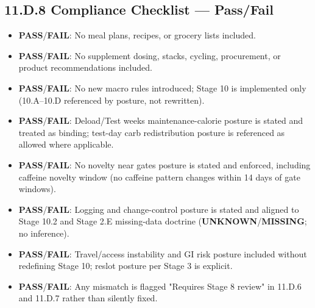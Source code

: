 \documentclass[10pt]{article}
\begin{document}
\newpage

\subsection*{11.D.8 Compliance Checklist — Pass/Fail}
{}

\begin{itemize}
\item \textbf{PASS}/\textbf{FAIL}: No meal plans, recipes, or grocery lists included.
\item \textbf{PASS}/\textbf{FAIL}: No supplement dosing, stacks, cycling, procurement, or product recommendations included.
\item \textbf{PASS}/\textbf{FAIL}: No new macro rules introduced; Stage 10 is implemented only (10.A–10.D referenced by posture, not rewritten).
\item \textbf{PASS}/\textbf{FAIL}: Deload/Test weeks maintenance-calorie posture is stated and treated as binding; test-day carb redistribution posture is referenced as allowed where applicable.
\item \textbf{PASS}/\textbf{FAIL}: No novelty near gates posture is stated and enforced, including caffeine novelty window (no caffeine pattern changes within 14 days of gate windows).
\item \textbf{PASS}/\textbf{FAIL}: Logging and change-control posture is stated and aligned to Stage 10.2 and Stage 2.E missing-data doctrine (\textbf{UNKNOWN}/\textbf{MISSING}; no inference).
\item \textbf{PASS}/\textbf{FAIL}: Travel/access instability and GI risk posture included without redefining Stage 10; reslot posture per Stage 3 is explicit.
\item \textbf{PASS}/\textbf{FAIL}: Any mismatch is flagged "Requires Stage 8 review" in 11.D.6 and 11.D.7 rather than silently fixed.
\end{itemize}
\end{document}
